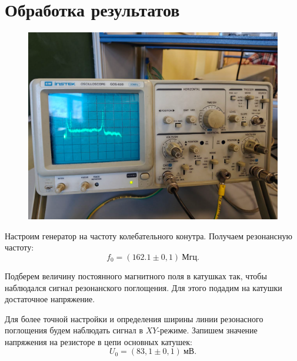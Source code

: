 \documentclass[a4paper,12pt]{article} %
\begin{document}
	
	
	\newpage
	\section{Обработка результатов}

    \begin{figure}[h!]
		\begin{floatrow}
			{\includegraphics[scale=0.3]{image.png}}    
		\end{floatrow}
	\end{figure}


		Настроим генератор на частоту колебательного конутра. Получаем резонансную частоту:
		\begin{equation*}
			f_0 = (162.1 \pm 0,1) \ \text{Мгц}.
		\end{equation*}
	
		Подберем величину постоянного магнитного поля в катушках так, чтобы наблюдался сигнал резонанского поглощения. Для этого подадим на катушки достаточное напряжение.
		
		Для более точной настройки и определения ширины линии резонасного поглощения будем наблюдать сигнал в $XY$-режиме. Запишем значение напряжения на резисторе в цепи основных катушек:
		\begin{equation*}
			U_0 = (83,1 \pm 0,1) \ \text{мВ}.
		\end{equation*}
	
\end{document}
